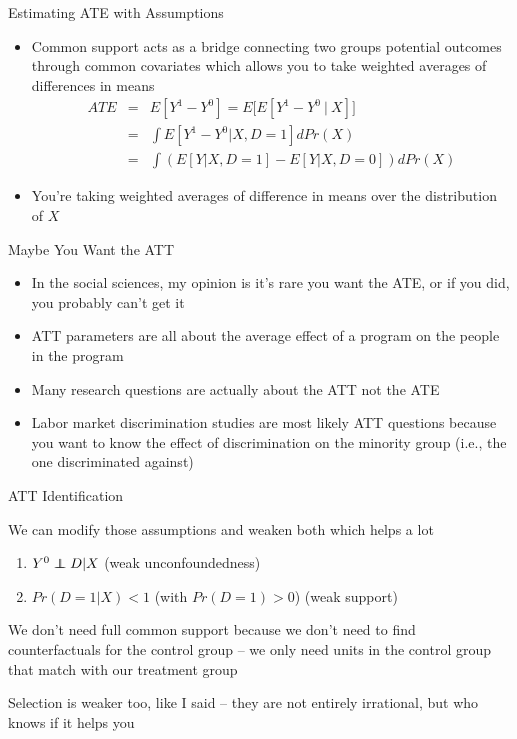 \documentclass{beamer}
\newcommand\independent{\protect\mathpalette{\protect\independenT}{\perp}}
\def\independenT#1#2{\mathrel{\rlap{$#1#2$}\mkern2mu{#1#2}}}
\begin{document}
\begin{frame}{Estimating ATE with Assumptions}


	\begin{itemize}
	\item Common support acts as a bridge connecting two groups potential outcomes through common covariates which allows you to take weighted averages of differences in means
		\begin{eqnarray*}
		ATE &=&E[Y^1-Y^0] = E\bigg[ E[Y^1 - Y^0 \ \vert \ X] \bigg] \\
		&=& \int E[Y^1 - Y^0 |X,D=1] dPr(X) \\
		&=& \int \left(E[Y|X,D=1] - E[Y|X,D=0]\right)dPr(X)
		\end{eqnarray*}
	\item You're taking weighted averages of difference in means over the distribution of $X$
	\end{itemize}

\end{frame}




\begin{frame}{Maybe You Want the ATT}

\begin{itemize}
\item In the social sciences, my opinion is it's rare you want the ATE, or if you did, you probably can't get it
\item ATT parameters are all about the average effect of a program on the people in the program
\item Many research questions are actually about the ATT not the ATE 
\item Labor market discrimination studies are most likely ATT questions because you want to know the effect of discrimination on the minority group (i.e., the one discriminated against)
\end{itemize}

\end{frame}




\begin{frame}{ATT Identification}

We can modify those assumptions and weaken both which helps a lot

\begin{enumerate}
  \item $Y^0 \independent{D} | X$ (weak unconfoundedness)
  \item $Pr(D=1|X)<1$ (with $Pr(D=1)>0$) (weak support)
\end{enumerate}

\bigskip

We don't need full common support because we don't need to find counterfactuals for the control group -- we only need units in the control group that match with our treatment group

\bigskip

Selection is weaker too, like I said -- they are not entirely irrational, but who knows if it helps you

\end{frame}
\end{document}
